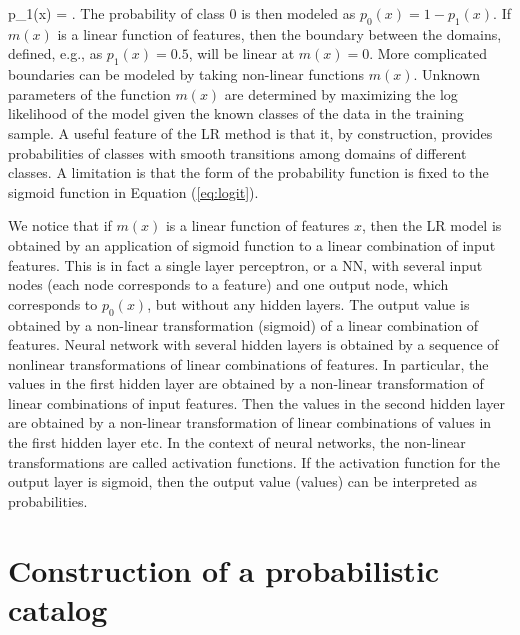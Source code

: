 \be
{}
p_1(x) = .
\ee
The probability of class 0 is then modeled as $p_0(x) = 1 - p_1(x)$.
If $m(x)$ is a linear function of features, then the boundary between the domains, defined, e.g., as $p_1(x) = 0.5$, will be linear
at $m(x) = 0$.
More complicated boundaries can be modeled by taking non-linear functions $m(x)$.
Unknown parameters of the function $m(x)$ are determined by maximizing the log likelihood of the model given the known classes of the data in the training sample.
A useful feature of the LR method is that it, by construction, provides probabilities of classes with smooth transitions among domains of different classes.
A limitation is that the form of the probability function is fixed to the sigmoid function in Equation (\ref{eq:logit}).

We notice that if $m(x)$ is a linear function of features $x$, then the LR model is obtained by an application of sigmoid function to a linear combination of input features.
This is in fact a single layer perceptron, or a NN, with several input nodes (each node corresponds to a feature) and one output node, which corresponds to $p_0(x)$, but without any hidden layers.
The output value is obtained by a non-linear transformation (sigmoid) of a linear combination of features.
Neural network with several hidden layers is obtained by a sequence of nonlinear transformations of linear combinations of features.
In particular, the values in the first hidden layer are obtained by a non-linear transformation of linear combinations of input features.
Then the values in the second hidden layer are obtained by a non-linear transformation of linear combinations of values in the first hidden layer etc.
In the context of neural networks, the non-linear transformations are called activation functions.
If the activation function for the output layer is sigmoid, then the output value (values) can be interpreted as probabilities.

\section{Construction of a probabilistic catalog}

